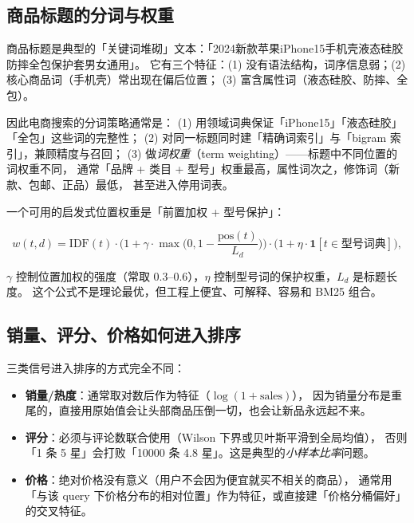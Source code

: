 \subsection{商品标题的分词与权重}

商品标题是典型的「关键词堆砌」文本：「2024新款苹果iPhone15手机壳液态硅胶防摔全包保护套男女通用」。
它有三个特征：(1) 没有语法结构，词序信息弱；(2) 核心商品词（手机壳）常出现在偏后位置；
(3) 富含属性词（液态硅胶、防摔、全包）。

因此电商搜索的分词策略通常是：
(1) 用领域词典保证「iPhone15」「液态硅胶」「全包」这些词的完整性；
(2) 对同一标题同时建「精确词索引」与「bigram 索引」，兼顾精度与召回；
(3) 做\emph{词权重}（term weighting）——标题中不同位置的词权重不同，
通常「品牌 + 类目 + 型号」权重最高，属性词次之，修饰词（新款、包邮、正品）最低，
甚至进入停用词表。

一个可用的启发式位置权重是「前置加权 + 型号保护」：

\begin{equation}
w(t, d) = \text{IDF}(t) \cdot \Big( 1 + \gamma \cdot \max\Big(0, 1 - \frac{\text{pos}(t)}{L_d}\Big) \Big) \cdot \big( 1 + \eta \cdot \mathbf{1}[t \in \text{型号词典}] \big) ,
\label{eq:termweight}
\end{equation}

$\gamma$ 控制位置加权的强度（常取 0.3--0.6），$\eta$ 控制型号词的保护权重，$L_d$ 是标题长度。
这个公式不是理论最优，但工程上便宜、可解释、容易和 BM25 组合。

\subsection{销量、评分、价格如何进入排序}

三类信号进入排序的方式完全不同：

\begin{itemize}
  \item \textbf{销量/热度}：通常取对数后作为特征（$\log(1 + \text{sales})$），
        因为销量分布是重尾的，直接用原始值会让头部商品压倒一切，也会让新品永远起不来。
  \item \textbf{评分}：必须与评论数联合使用（Wilson 下界或贝叶斯平滑到全局均值），
        否则「1 条 5 星」会打败「10000 条 4.8 星」。这是典型的\emph{小样本比率}问题。
  \item \textbf{价格}：绝对价格没有意义（用户不会因为便宜就买不相关的商品），
        通常用「与该 query 下价格分布的相对位置」作为特征，或直接建「价格分桶偏好」的交叉特征。
\end{itemize}

